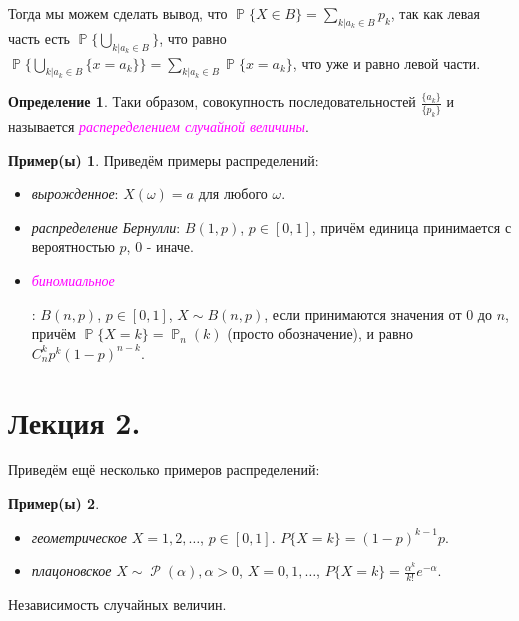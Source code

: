 \documentclass[a4paper,100pt]{article}
\theoremstyle{indented}
\theoremstyle{definition}
\newtheorem{defn}{Определение}
\newtheorem{exl}{Пример(ы)}
\theoremstyle{remark}
\DeclareMathOperator{\PP}{\mathbb{P}}
\DeclareMathOperator{\Rho}{\mathcal{P}}
\begin{document}
Тогда мы можем сделать вывод, что $\PP\{X\in B\}=\sum_{k\vert a_k\in B}p_k$, так как левая часть есть $\PP\{\bigcup_{k\vert a_k\in B}\}$, что равно $\PP\{\bigcup_{k\vert a_k\in B}\{x=a_k\}\}=\sum_{k\vert a_k\in B}\PP\{x=a_k\}$, что уже и равно левой части.\

\begin{defn}
    Таки образом, совокупность последовательностей $\frac{\{a_k\}}{\{p_k\}}$ и называется \hypertarget{n9}{\textcolor{magenta}{\textit{распеределением случайной величины}}}. 
\end{defn}

\begin{exl}
    Приведём примеры распределений:

    \begin{itemize}
        \item \textit{вырожденное}: $X(\omega)=a$ для любого $\omega$.
        \item \textit{распределение Бернулли}: $B(1, p)$, $p\in[0,1]$, причём единица принимается с вероятностью $p$, $0$ - иначе.
        \item \hypertarget{n10}{\textcolor{magenta}{\textit{биномиальное}}}: $B(n, p)$, $p\in[0,1]$, $X\sim B(n, p)$, если принимаются значения от $0$ до $n$, причём $\PP\{X=k\}=\PP_n(k)$ (просто обозначение), и равно $C_n^kp^k(1-p)^{n-k}$.
    \end{itemize}

\end{exl}

\section{Лекция 2.}

Приведём ещё несколько примеров распределений: 

\begin{exl}
    \begin{itemize}
        \item \textit{геометрическое} $X = 1, 2, \ldots$, $p\in[0,1]$. $P\{X=k\}=(1-p)^{k-1}p$.
        \item \textit{плацоновское} $X\sim \Rho(\alpha), \alpha>0$, $X=0, 1, \ldots$, $P\{X=k\}=\frac{\alpha^k}{k!}e^{-\alpha}$. 
    \end{itemize}
\end{exl}

Независимость случайных величин.
\end{document}
